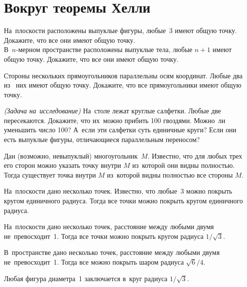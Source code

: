 
\section*{Вокруг теоремы Хелли}


\begin{problems}

\item{}
\sp
На~плоскости расположены выпуклые фигуры, любые~3 имеют общую точку.
Докажите, что все они имеют общую точку.
\\
\sp
В~$n$-мерном пространстве расположены выпуклые тела, любые $n + 1$ имеют общую
точку.
Докажите, что все они имеют общую точку.

\item
Стороны нескольких прямоугольников параллельны осям координат.
Любые два из~ них имеют общую точку.
Докажите, что все прямоугольники имеют общую точку.

\item\emph{(Задача на~исследование)}
На~столе лежат круглые салфетки.
Любые две пересекаются.
Докажите, что их~можно прибить 100 гвоздями.
Можно~ли уменьшить число 100?
А~если эти салфетки суть единичные круги?
Если они есть выпуклые фигуры, отличающиеся параллельным переносом?

\item{}
Дан (возможно, невыпуклый) многоугольник~$M$.
Известно, что для любых трех его сторон можно указать точку внутри $M$
из~которой они видны полностью.
Тогда существует точка внутри $M$ из~которой видны полностью все стороны $M$.

\item
На~плоскости дано несколько точек.
Известно, что любые~3 можно покрыть кругом единичного радиуса.
Тогда все точки можно покрыть кругом единичного радиуса.

\item{}
На~плоскости дано несколько точек, расстояние между любыми двумя
не~превосходит~1.
Тогда все точки можно покрыть кругом радиуса $1 / \sqrt{3}$.

\item{}
В~пространстве дано несколько точек, расстояние между любыми двумя
не~превосходит~1.
Тогда все можно покрыть шаром радиуса $\sqrt{6} / 4$.

\item
Любая фигура диаметра~1 заключается в~круг радиуса $1 / \sqrt{3}$.


\end{problems}
